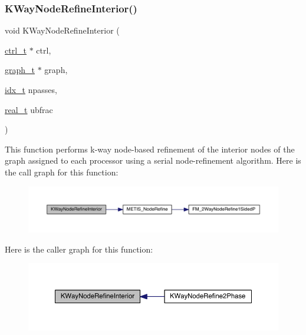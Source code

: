 \subsubsection{\texorpdfstring{K\+Way\+Node\+Refine\+Interior()}{KWayNodeRefineInterior()}}
{\footnotesize\ttfamily void K\+Way\+Node\+Refine\+Interior (\begin{DoxyParamCaption}\item[{\hyperlink{a00742}{ctrl\+\_\+t} $\ast$}]{ctrl,  }\item[{\hyperlink{a00734}{graph\+\_\+t} $\ast$}]{graph,  }\item[{\hyperlink{a00876_aaa5262be3e700770163401acb0150f52}{idx\+\_\+t}}]{npasses,  }\item[{\hyperlink{a00876_a1924a4f6907cc3833213aba1f07fcbe9}{real\+\_\+t}}]{ubfrac }\end{DoxyParamCaption})}

This function performs k-\/way node-\/based refinement of the interior nodes of the graph assigned to each processor using a serial node-\/refinement algorithm. Here is the call graph for this function\+:\nopagebreak
\begin{figure}[H]
\begin{center}
\leavevmode
\includegraphics[width=350pt]{a00951_ad38351510bbf07393425b90ea3c4f5bd_cgraph}
\end{center}
\end{figure}
Here is the caller graph for this function\+:\nopagebreak
\begin{figure}[H]
\begin{center}
\leavevmode
\includegraphics[width=350pt]{a00951_ad38351510bbf07393425b90ea3c4f5bd_icgraph}
\end{center}
\end{figure}
\mbox{\label{a00951_ac5adb43852e1166a0ac5157b7cb076eb}} 
